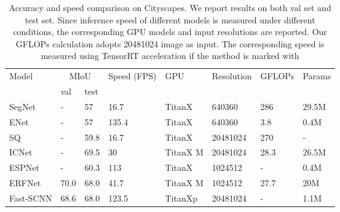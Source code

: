 \documentclass[journal]{IEEEtran}
\begin{document}
\begin{table*}[]
\caption{Accuracy and speed comparison on Cityscapes. We report results on both val set and test set. Since inference speed of different models is measured under different conditions, the corresponding GPU models and input resolutions are reported. Our GFLOPs calculation adopts 20481024 image as input. The corresponding speed is measured using TensorRT acceleration if the method is marked with \dag}
\label{tab:1}
\begin{tabular}{p{80pt}p{43pt}<{\centering}p{43pt}<{\centering}p{50pt}<{\centering}p{50pt}<{\centering}p{50pt}<{\centering}p{50pt}<{\centering}p{50pt}<{\centering}}
\toprule
\multirow{2}{*}{Model} & \multicolumn{2}{c}{MIoU} & \multirow{2}{*}{Speed (FPS)} & \multirow{2}{*}{GPU} & \multirow{2}{*}{Resolution} & \multirow{2}{*}{GFLOPs} & \multirow{2}{*}{Params} \\ \cmidrule{2-3}
                       & val         & test       &                      &                      &                             &                         &                         \\ \midrule
SegNet\cite{badrinarayanan2017segnet}& -           & 57         & 16.7                 & TitanX               & 640360              & 286                        & 29.5M                   \\
ENet\cite{paszke2016enet}  & -           & 57         & 135.4                & TitanX               & 640360              & 3.8                        & 0.4M                    \\
SQ\cite{treml2016speeding} & -           & 59.8       & 16.7                 & TitanX               & 20481024            & 270                        & -                       \\
ICNet\cite{zhao2018icnet}  & -           & 69.5       & 30                   & TitanX M             & 20481024            & 28.3                       & 26.5M                   \\
ESPNet\cite{mehta2018espnet}& -           & 60.3       & 113                  & TitanX               & 1024512             & -                       & 0.4M                    \\
ERFNet\cite{romera2017erfnet}& 70.0        & 68.0       & 41.7                 & TitanX M             & 1024512             & 27.7                    & 20M                     \\ \midrule
Fast-SCNN\cite{poudel2019fast}& 68.6        & 68.0       & 123.5                & TitanXp              & 20481024            & -                        & 1.1M                    \\

\end{tabular}
\end{table*}
\end{document}
